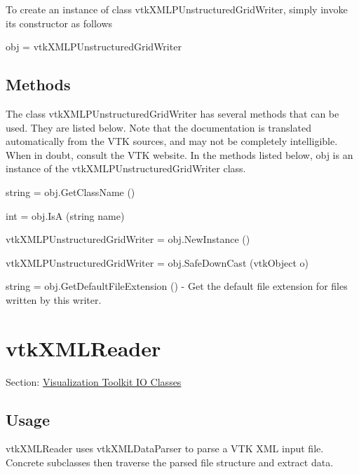 To create an instance of class vtk\-X\-M\-L\-P\-Unstructured\-Grid\-Writer, simply invoke its constructor as follows \begin{DoxyVerb}  obj = vtkXMLPUnstructuredGridWriter
\end{DoxyVerb}
 \hypertarget{vtkwidgets_vtkxyplotwidget_Methods}{}\subsection{Methods}\label{vtkwidgets_vtkxyplotwidget_Methods}
The class vtk\-X\-M\-L\-P\-Unstructured\-Grid\-Writer has several methods that can be used. They are listed below. Note that the documentation is translated automatically from the V\-T\-K sources, and may not be completely intelligible. When in doubt, consult the V\-T\-K website. In the methods listed below, {\ttfamily obj} is an instance of the vtk\-X\-M\-L\-P\-Unstructured\-Grid\-Writer class. 
\begin{DoxyItemize}
\item {\ttfamily string = obj.\-Get\-Class\-Name ()}  
\item {\ttfamily int = obj.\-Is\-A (string name)}  
\item {\ttfamily vtk\-X\-M\-L\-P\-Unstructured\-Grid\-Writer = obj.\-New\-Instance ()}  
\item {\ttfamily vtk\-X\-M\-L\-P\-Unstructured\-Grid\-Writer = obj.\-Safe\-Down\-Cast (vtk\-Object o)}  
\item {\ttfamily string = obj.\-Get\-Default\-File\-Extension ()} -\/ Get the default file extension for files written by this writer.  
\end{DoxyItemize}\hypertarget{vtkio_vtkxmlreader}{}\section{vtk\-X\-M\-L\-Reader}\label{vtkio_vtkxmlreader}
Section\-: \hyperlink{sec_vtkio}{Visualization Toolkit I\-O Classes} \hypertarget{vtkwidgets_vtkxyplotwidget_Usage}{}\subsection{Usage}\label{vtkwidgets_vtkxyplotwidget_Usage}
vtk\-X\-M\-L\-Reader uses vtk\-X\-M\-L\-Data\-Parser to parse a V\-T\-K X\-M\-L input file. Concrete subclasses then traverse the parsed file structure and extract data.

